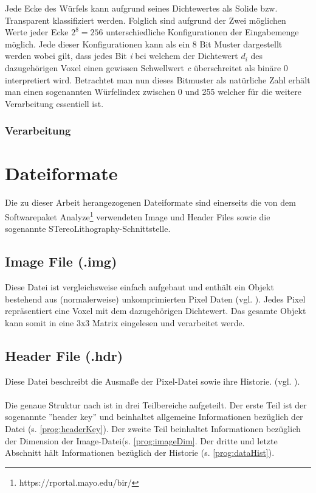 Jede Ecke des Würfels kann aufgrund seines Dichtewertes als Solide bzw. Transparent klassifiziert werden. Folglich sind aufgrund der Zwei möglichen Werte jeder Ecke $2^{8} = 256$ unterschiedliche Konfigurationen der Eingabemenge möglich. Jede dieser Konfigurationen kann als ein 8 Bit Muster dargestellt werden wobei gilt, dass jedes Bit \textit{i} bei welchem der Dichtewert \textit{$d_{i}$} des dazugehörigen Voxel einen gewissen Schwellwert \textit{c} überschreitet als binäre 0 interpretiert wird. Betrachtet man nun dieses Bitmuster als natürliche Zahl erhält man einen sogenannten Würfelindex zwischen 0  und 255 welcher für die weitere Verarbeitung essentiell ist.

\subsubsection{Verarbeitung}

\section{Dateiformate}
Die zu dieser Arbeit herangezogenen Dateiformate sind einerseits die von dem Softwarepaket Analyze\footnote{https://rportal.mayo.edu/bir/} verwendeten Image und Header Files sowie die sogenannte STereoLithography-Schnittstelle. 

\subsection{Image File (.img)}
Diese Datei ist vergleichsweise einfach aufgebaut und enthält ein Objekt bestehend aus (normalerweise) unkomprimierten Pixel Daten (vgl. \cite{AnalyzeFormat}). Jedes Pixel repräsentiert eine Voxel mit dem dazugehörigen Dichtewert. Das gesamte Objekt kann somit in eine 3x3 Matrix eingelesen und verarbeitet werde.

\subsection{Header File (.hdr)}
Diese Datei beschreibt die Ausmaße der Pixel-Datei sowie ihre Historie. (vgl. \cite{AnalyzeFormat}). \\\\
Die genaue Struktur nach \cite{AnalyzeFormat} ist in drei Teilbereiche aufgeteilt. Der erste Teil ist der sogenannte ''header key'' und beinhaltet allgemeine Informationen bezüglich der Datei (s. \ref{prog:headerKey}). Der zweite Teil beinhaltet Informationen bezüglich der Dimension der Image-Datei(s. \ref{prog:imageDim}. Der dritte und letzte Abschnitt hält Informationen bezüglich der Historie (s. \ref{prog:dataHist}).

